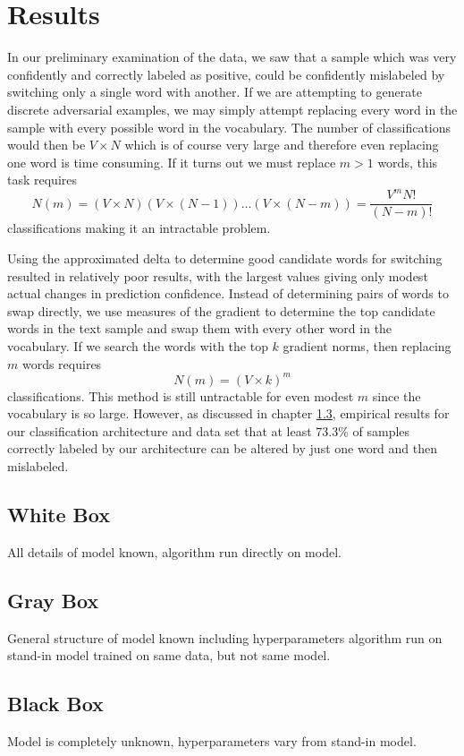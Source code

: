 \chapter{Results}
In our preliminary examination of the data, we saw that a sample which was very confidently and correctly labeled as positive, could be confidently mislabeled by switching only a single word with another.  If we are attempting to generate discrete adversarial examples, we may simply attempt replacing every word in the sample with every possible word in the vocabulary.  The number of classifications would then be $V\times N$ which is of course very large and therefore even replacing one word is time consuming.  If it turns out we must replace $m>1$ words, this task requires 
\begin{equation}
N(m) = (V\times N)(V\times (N-1))\dots(V\times (N-m)) = \frac{V^m N!}{(N-m)!}
\end{equation}
classifications making it an intractable problem.

Using the approximated delta to determine good candidate words for switching resulted in relatively poor results, with the largest values giving only modest actual changes in prediction confidence.  Instead of determining pairs of words to swap directly, we use measures of the gradient to determine the top candidate words in the text sample and swap them with every other word in the vocabulary.  If we search the words with the top $k$ gradient norms, then replacing $m$ words requires
\begin{equation}
N(m) = (V\times k)^m
\end{equation}
classifications.  This method is still untractable for even modest $m$ since the vocabulary is so large.  However, as discussed in chapter \ref{}, empirical results for our classification architecture and data set that at least 73.3\% of samples correctly labeled by our architecture can be altered by just one word and then mislabeled.

\section{White Box}
All details of model known, algorithm run directly on model.
\section{Gray Box}
General structure of model known including hyperparameters
 algorithm run on stand-in model trained on same data, but not same model.
\section{Black Box}
Model is completely unknown, hyperparameters vary from stand-in model.


